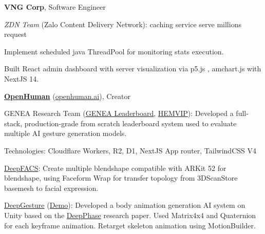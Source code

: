 \cvspace

\begin{twocolentry}{
	}
	\textbf{VNG Corp}, Software Engineer
	
	\textit{ZDN Team} (Zalo Content Delivery Network): caching service serve millions request
	\begin{highlights}
		\item Implement scheduled java ThreadPool for monitoring stats execution.
		\item Built React admin dashboard with server visualization via p5.js , amchart.js with NextJS 14.
	\end{highlights}
\end{twocolentry}

\begin{twocolentry}{
	}
	\href{https://www.linkedin.com/company/openhuman/}{\textbf{OpenHuman}} (\href{https://openhuman.ai}{openhuman.ai}), Creator
	
	\begin{highlights}
		\item GENEA Research Team (\href{https://genealeaderboard.github.io}{GENEA Leaderboard}, \href{https://github.com/hemvip/hemvip.github.io}{HEMVIP}): Developed a full-stack, production-grade from scratch leaderboard system used to evaluate multiple AI gesture generation models.
		
		Technologies:  Cloudflare Workers, R2, D1, NextJS App router, TailwindCSS V4
		
		\item  \href{https://github.com/DeepFACS}{DeepFACS}: Create multiple blendshape compatible with ARKit 52 for blendshape, using Faceform Wrap for transfer topology from 3DScanStore basemesh to facial expression.
		
		\item \href{https://github.com/DeepGesture/DeepGesture-Unity}{DeepGesture} (\href{https://www.youtube.com/watch?v=eZghfNGmZn8}{Demo}): Developed a body animation generation AI system on Unity based on the \href{https://www.youtube.com/watch?v=YhH4PYEkVnY}{DeepPhase} research paper. Used Matrix4x4 and Quaternion for each keyframe animation. Retarget skeleton animation using MotionBuilder.
	\end{highlights}
	
\end{twocolentry}
